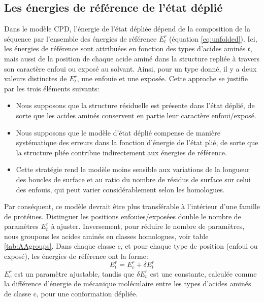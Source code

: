 \subsection{Les énergies de référence de l'état déplié}

Dans le modèle CPD, l'énergie de l'état dépliée dépend de la composition de la séquence par l'ensemble des énergies de référence $E^r_t$ (équation \ref{eq:unfolded}). Ici, les énergies de référence sont attribuées en fonction des types d'acides aminés $t$, mais aussi de la position de chaque acide aminé dans la structure repliée à travers son caractère enfoui ou exposé au solvant. Ainsi, pour un type donné, il y a deux valeurs distinctes de $E^r_t$, une enfouie et une exposée. Cette approche se justifie par les trois éléments suivants:

\begin{itemize}
\item Nous supposons que la structure résiduelle est présente dans l'état déplié, de sorte que les acides aminés conservent en partie leur caractère enfoui/exposé.
\item Nous supposons que le modèle d'état déplié compense de manière systématique des erreurs dans la fonction d'énergie de l'état plié, de sorte que  la structure pliée contribue indirectement aux énergies de référence.
\item Cette stratégie rend le modèle moins sensible aux variations de la longueur des boucles de surface et au ratio  du nombre de résidus de surface sur  celui des enfouis, qui peut varier considérablement selon les homologues.  
\end{itemize}
Par conséquent, ce modèle devrait être plus transférable à l'intérieur d'une famille de protéines. Distinguer les positions enfouies/exposées double le nombre de paramètres $E^r_t$ à ajuster. Inversement, pour réduire le nombre de paramètres, nous groupons les acides aminés en classes homologues, voir table \ref{tab:AAgroups}. Dans chaque classe c, et pour chaque type de position (enfoui ou exposé), les énergies de référence ont la forme:
\begin{equation}
E^r_t = E^r_c + \delta E^r_t
\end{equation}
$E^r_c$ est un paramètre ajustable, tandis que $\delta E^r_t$ est une constante, calculée comme la différence d'énergie de mécanique moléculaire entre les types d'acides aminés de classe c, pour une conformation dépliée.

